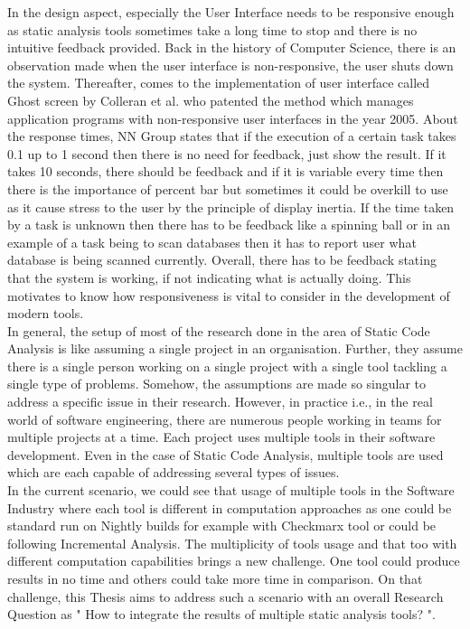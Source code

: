 In the design aspect, especially the User Interface needs to be responsive \cite{NB18} enough as static analysis tools sometimes take a long time to stop and there is no intuitive feedback provided. Back in the history of Computer Science, there is an observation made when the user interface is non-responsive, the user shuts down the system. Thereafter, comes to the implementation of user interface called Ghost screen by Colleran et al. \cite{colleran} who patented the method which manages application programs with non-responsive user interfaces in the year 2005. About the response times, NN Group \cite{nn} states that if the execution of a certain task takes 0.1 up to 1 second then there is no need for feedback, just show the result. If it takes 10 seconds, there should be feedback and if it is variable every time then there is the importance of percent bar \cite{Borman} but sometimes it could be overkill to use as it cause stress to the user by the principle of display inertia. If the time taken by a task is unknown then there has to be feedback like a spinning ball or in an example of a task being to scan databases then it has to report user what database is being scanned currently. Overall, there has to be feedback stating that the system is working, if not indicating what is actually doing. This motivates to know how responsiveness is vital to consider in the development of modern tools. \\

In general, the setup of most of the research done in the area of Static Code Analysis is like assuming a single project in an organisation. Further, they assume there is a single person working on a single project with a single tool tackling a single type of problems.  Somehow, the assumptions are made so singular to address a specific issue in their research. However, in practice i.e., in the real world of software engineering, there are numerous people working in teams for multiple projects at a time. Each project uses multiple tools in their software development. Even in the case of Static Code Analysis, multiple tools are used which are each capable of addressing several types of issues. \\

In the current scenario, we could see that usage of multiple tools in the Software Industry where each tool is different in computation approaches as one could be standard run on Nightly builds for example with Checkmarx \cite{checkmarx} tool or could be following Incremental Analysis. The multiplicity of tools usage and that too with different computation capabilities brings a new challenge.  One tool could produce results in no time and others could take more time in comparison. On that challenge, this Thesis aims to address such a scenario with an overall Research Question as " How to integrate the results of multiple static analysis tools? ". \\

